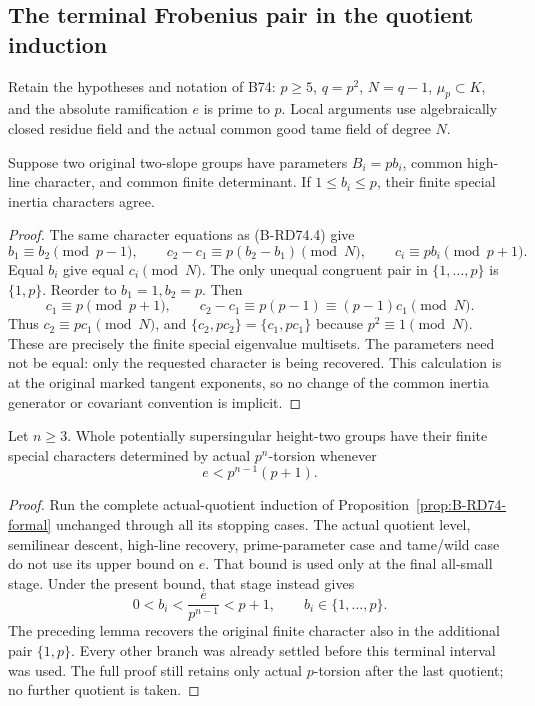 \subsection{The terminal Frobenius pair in the quotient induction}

Retain the hypotheses and notation of B74: \(p\ge5\),
\(q=p^2\), \(N=q-1\), \(\mu_p\subset K\), and the
absolute ramification \(e\) is prime to \(p\).
Local arguments use algebraically closed residue field and
the actual common good tame field of degree \(N\).

\begin{lemma}
\label{lem:B-RD75-terminal}
Suppose two original two-slope groups have parameters
\(B_i=pb_i\), common high-line character, and common finite
determinant. If \(1\le b_i\le p\), their finite special
inertia characters agree.
\end{lemma}
\begin{proof}
The same character equations as (B-RD74.4) give
\[
 b_1\equiv b_2\pmod{p-1},\qquad
 c_2-c_1\equiv p(b_2-b_1)\pmod N,
 \qquad c_i\equiv pb_i\pmod{p+1}.
 \tag{B-RD75.1}
\]
Equal \(b_i\) give equal \(c_i\pmod N\). The only unequal
congruent pair in \(\{1,\ldots,p\}\) is \(\{1,p\}\).
Reorder to \(b_1=1,b_2=p\). Then
\[
 c_1\equiv p\pmod{p+1},\qquad
 c_2-c_1\equiv p(p-1)\equiv(p-1)c_1\pmod N.
 \tag{B-RD75.2}
\]
Thus \(c_2\equiv pc_1\pmod N\), and
\(\{c_2,pc_2\}=\{c_1,pc_1\}\) because \(p^2\equiv1\pmod N\).
These are precisely the finite special eigenvalue multisets.
The parameters need not be equal: only the requested character
is being recovered. This calculation is at the original
marked tangent exponents, so no change of the common inertia
generator or covariant convention is implicit.
\end{proof}

\begin{proposition}
\label{prop:B-RD75-formal}
Let \(n\ge3\). Whole potentially supersingular height-two
groups have their finite special characters determined by
actual \(p^n\)-torsion whenever
\[
 e<p^{n-1}(p+1).
 \tag{B-RD75.3}
\]
\end{proposition}
\begin{proof}
Run the complete actual-quotient induction of
Proposition~\ref{prop:B-RD74-formal} unchanged through all
its stopping cases. The actual quotient level, semilinear
descent, high-line recovery, prime-parameter case and tame/wild
case do not use its upper bound on \(e\). That bound is used
only at the final all-small stage. Under the present bound,
that stage instead gives
\[
 0<b_i<\frac{e}{p^{n-1}}<p+1,
 \qquad b_i\in\{1,\ldots,p\}.
 \tag{B-RD75.4}
\]
The preceding lemma recovers the original finite character
also in the additional pair \(\{1,p\}\). Every other branch
was already settled before this terminal interval was used.
The full proof still retains only actual \(p\)-torsion after
the last quotient; no further quotient is taken.
\end{proof}


